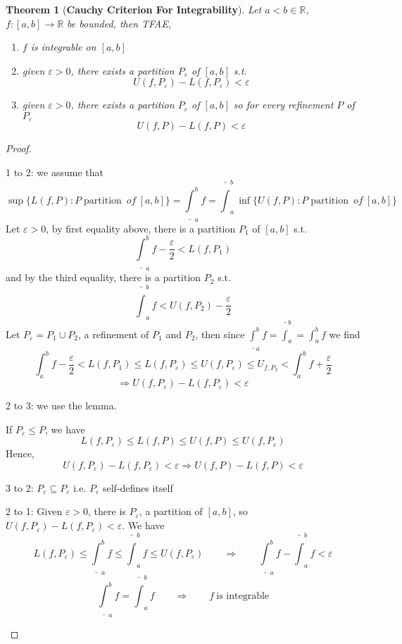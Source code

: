 \documentclass[12pt]{article}
\theoremstyle{plain}
\newtheorem{theorem}{Theorem}[subsection]
\newcommand{\ep}{\varepsilon}
\DeclareMathOperator{\Par}{partition}
\begin{document}
	\newpage
	\begin{theorem}[\textbf{Cauchy Criterion For Integrability}]
		Let $a<b \in \mathbb{R}$, $f:[a,b] \to \mathbb{R}$ be bounded, then 
		TFAE,
		\begin{enumerate}
			\item $f$ is integrable on $[a,b]$
			\item given $\ep > 0$, there exists a partition $P_{\ep}$
				of $[a,b]$ s.t.  
				\[
					U(f,P_{\ep}) - L(f,P_{\ep}) < \ep
				\]
			\item given $\ep>0$, there exists a partition $P_{\ep}$ of $[a,b]$
				so for every refinement $P$ of $P_{\ep}$ 
				\[
					U(f,P) - L(f,P)<\ep
				\]
		\end{enumerate}
	\end{theorem}
	\begin{proof}
		\begin{description}
			\item 1 to 2: we assume that 
				\[
					\sup\{L(f,P): P \Par \ of \ [a,b]\}
					= \underline{\int}_a^b f = \bar{\int}_a^b 
					\inf\{U(f,P): P \Par \ of \ [a,b]\}
				\]
				Let $\ep>0$, by first equality above, there is a partition 
				$P_1$ of $[a,b]$ s.t. 
				\[
					\underline{\int}_a^b f -\frac{\ep}2<L(f,P_1)
				\]
				and by the third equality, there is a partition $P_2$ s.t.
				\[
					\bar{\int}_a^b f < U(f,P_2) - \frac{\ep}2 
				\]
				Let $P_{\ep}=P_1\cup P_2$, a refinement of $P_1$ and $P_2$,
				then since $\underline{\int}_a^b f = \bar{\int}_a^b=
				\int_a^b f$ we find   
				\[
					\int_a^b f-\frac{\ep}2 <L(f,P_1) \leq L(f,P_{\ep})\leq 
					U(f,P_{\ep}) \leq U_{f,P_2} < \int_a^b f+\frac{\ep}2
				\]
				\[
					\Rightarrow U(f,P_{\ep})-L(f,P_{\ep})<\ep
				\]
				
			\item 2 to 3: we use the lemma. 

				If $P_{\ep}\leq P$, we have 
				\[
					L(f,P_{\ep})\leq L(f,P)\leq U(f,P)\leq U(f,P_{\ep})
				\]
				Hence, 
				\[
					U(f,P_{\ep}) -L(f,P_{\ep})<\ep\Rightarrow U(f,P)-L(f,P)<\ep
				\]
			\item 3 to 2: $P_{\ep}\subseteq P_{\ep}$ i.e. $P_{\ep}$ 
				self-defines itself
			\item 2 to 1: Given $\ep>0$, there is $P_{\ep}$, a partition of
				$[a,b]$, so $U(f,P_{\ep})-L(f,P_{\ep})<\ep$.
				We have 
				\[
					L(f,P_{\ep})
					\leq \underline{\int}_a^b f
					\leq \bar{\int}_a^b f
					\leq U(f,P_{\ep}) 
					\qquad \Rightarrow \qquad 
					\underline{\int}_a^b f- \bar{\int}_a^b f < \ep
				\]
				\[
					\underline{\int}_a^b f
					= \bar{\int}_a^b f
					\qquad \Rightarrow \qquad f \ \text{is integrable}
				\]
		\end{description}
	\end{proof}
\end{document}
